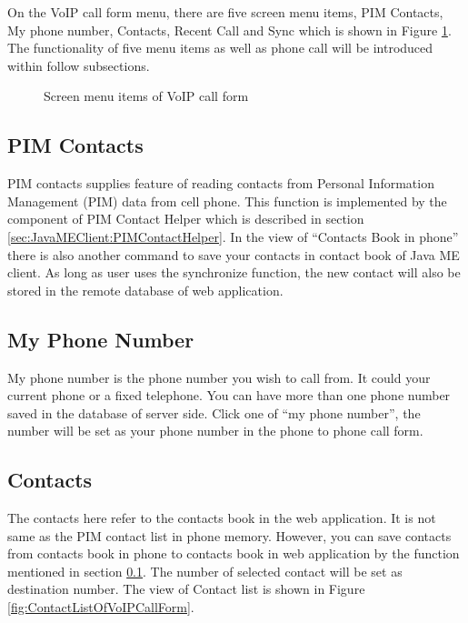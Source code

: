 On the VoIP call form menu, there are five screen menu items, PIM Contacts, My phone number, Contacts, Recent Call and Sync which is shown in Figure \ref{fig:ScreenMenuItemsOfVoIPCallForm}. The functionality of five menu items as well as phone call will be introduced within follow subsections.

\begin{figure}[!hbtp]
\centering
{}
\caption{Screen menu items of VoIP call form}
\label{fig:ScreenMenuItemsOfVoIPCallForm}
\end{figure}

\subsection{PIM Contacts}
\label{sec:JavaMEClient:UserInterface:PIMContacts}

PIM contacts supplies feature of reading contacts from Personal Information Management (PIM) data from cell phone. This function is implemented by the component of \textsf{PIM Contact Helper} which is described in section \ref{sec:JavaMEClient:PIMContactHelper}. In the view of ``Contacts Book in phone'' there is also another command to save your contacts in contact book of Java ME client. As long as user uses the synchronize function, the new contact will also be stored in the remote database of web application.

\subsection{My Phone Number}

My phone number is the phone number you wish to call from. It could your current phone or a fixed telephone. You can have more than one phone number saved in the database of server side. 
Click one of ``my phone number'', the number will be set as your phone number in the phone to phone call form.

\subsection{Contacts}

The contacts here refer to the contacts book in the web application. It is not same as the PIM contact list in phone memory. However, you can save contacts from contacts book in phone to contacts book in web application by the function mentioned in section \ref{sec:JavaMEClient:UserInterface:PIMContacts}. The number of selected contact will be set as destination number. The view of Contact list is shown in Figure \ref{fig:ContactListOfVoIPCallForm}.

